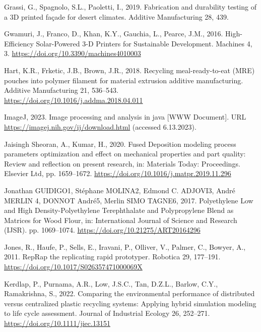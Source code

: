 \documentclass[
  12pt,
  number,
  review]{elsarticle}
\newlength{\cslhangindent}
\newlength{\cslentryspacingunit} %
\newenvironment{CSLReferences}[2] %
 {%
  \setlength{\parindent}{0pt}
  \ifodd #1
  \let\oldpar\par
  \def\par{\hangindent=\cslhangindent\oldpar}
  \fi
  \setlength{\parskip}{#2\cslentryspacingunit}
 }%
 {}
\begin{document}
\begin{CSLReferences}{1}{0}
\leavevmode{}%
Grassi, G., Spagnolo, S.L., Paoletti, I., 2019. Fabrication and
durability testing of a {3D} printed façade for desert climates.
Additive Manufacturing 28, 439.

\leavevmode{}%
Gwamuri, J., Franco, D., Khan, K.Y., Gauchia, L., Pearce, J.M., 2016.
High-{Efficiency Solar-Powered} 3-{D Printers} for {Sustainable
Development}. Machines 4, 3.
\url{https://doi.org/10.3390/machines4010003}

\leavevmode{}%
Hart, K.R., Frketic, J.B., Brown, J.R., 2018. Recycling
meal-ready-to-eat ({MRE}) pouches into polymer filament for material
extrusion additive manufacturing. Additive Manufacturing 21, 536--543.
\url{https://doi.org/10.1016/j.addma.2018.04.011}

\leavevmode{}%
ImageJ, 2023. Image processing and analysis in java {[}WWW Document{]}.
URL \url{https://imagej.nih.gov/ij/download.html} (accessed 6.13.2023).

\leavevmode{}%
Jaisingh Sheoran, A., Kumar, H., 2020. Fused {Deposition} modeling
process parameters optimization and effect on mechanical properties and
part quality: {Review} and reflection on present research, in: Materials
{Today}: {Proceedings}. {Elsevier Ltd}, pp. 1659--1672.
\url{https://doi.org/10.1016/j.matpr.2019.11.296}

\leavevmode{}%
Jonathan GUIDIGO1, Stéphane MOLINA2, Edmond C. ADJOVI3, André MERLIN 4,
DONNOT André5, Merlin SIMO TAGNE6, 2017. Polyethylene {Low} and {High
Density-Polyethylene Terephthalate} and {Polypropylene Blend} as
{Matrices} for {Wood Flour}, in: International {Journal} of {Science}
and {Research} ({IJSR}). pp. 1069--1074.
\url{https://doi.org/10.21275/ART20164296}

\leavevmode{}%
Jones, R., Haufe, P., Sells, E., Iravani, P., Olliver, V., Palmer, C.,
Bowyer, A., 2011. {RepRap} \textendash{} the replicating rapid
prototyper. Robotica 29, 177--191.
\url{https://doi.org/10.1017/S026357471000069X}

\leavevmode{}%
Kerdlap, P., Purnama, A.R., Low, J.S.C., Tan, D.Z.L., Barlow, C.Y.,
Ramakrishna, S., 2022. Comparing the environmental performance of
distributed versus centralized plastic recycling systems: {Applying}
hybrid simulation modeling to life cycle assessment. Journal of
Industrial Ecology 26, 252--271.
\url{https://doi.org/10.1111/jiec.13151}


\end{CSLReferences}
\end{document}
